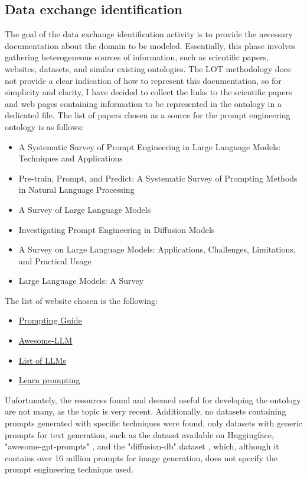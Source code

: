 \subsection{Data exchange identification}
The goal of the data exchange identification activity is to provide the necessary documentation
about the domain to be modeled. Essentially, this phase involves gathering heterogeneous sources of information, such as scientific papers, websites, datasets, and similar existing ontologies. The LOT methodology does not provide a clear indication of how to represent this documentation, so for simplicity and clarity, I have decided to collect the links to the scientific papers and web pages containing information to be represented in the ontology in a dedicated file. The list of papers chosen as a source for the prompt engineering ontology is as follows:
\begin{itemize}
\item A Systematic Survey of Prompt Engineering in Large Language Models: Techniques and Applications \cite{sahoo2024systematic}

\item Pre-train, Prompt, and Predict: A Systematic Survey
of Prompting Methods in Natural Language Processing \cite{liu2023pre}

\item A Survey of Large Language Models \cite{zhao2023survey}

\item Investigating Prompt Engineering in Diffusion
Models \cite{witteveen2022investigating}

\item A Survey on Large Language Models: Applications,
Challenges, Limitations, and Practical Usage \cite{hadi2023survey}

\item Large Language Models: A Survey \cite{minaee2024large}
\end{itemize}
The list of website chosen is the following:
\begin{itemize}
    \item \href{https://www.promptingguide.ai/}{Prompting Guide}
    
    \item \href{https://github.com/Hannibal046/Awesome-LLM}{Awesome-LLM}

    \item \href{https://llmmodels.org/}{List of LLMs}

    \item \href{https://learnprompting.org/}{Learn prompting}
\end{itemize}
Unfortunately, the resources found and deemed useful for developing the ontology are not many, as the topic is very recent. Additionally, no datasets containing prompts generated with specific techniques were found, only datasets with generic prompts for text generation, such as the dataset available on Huggingface, "awesome-gpt-prompts" \cite{awesome_gpt}, and the "diffusion-db" dataset \cite{diffusion_db}, which, although it contains over 16 million prompts for image generation, does not specify the prompt engineering technique used.

